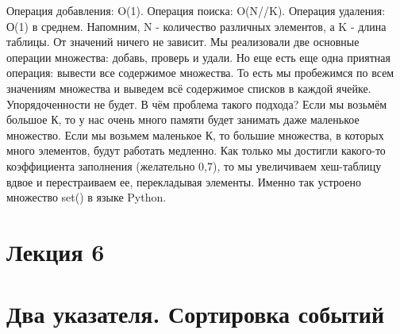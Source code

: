 \documentclass[12pt]{article}
\begin{document}
Операция добавления: O(1). Операция поиска: O(N//K). Операция удаления: О(1) в среднем. Напомним, N - количество различных элементов, а K - длина таблицы. От значений ничего не зависит. Мы реализовали две основные операции множества: добавь, проверь и удали. Но еще есть еще одна приятная операция: вывести все содержимое множества. То есть мы пробежимся по всем значениям множества и выведем всё содержимое списков в каждой ячейке. Упорядоченности не будет. В чём проблема такого подхода? Если мы возьмём большое К, то у нас очень много памяти будет занимать даже маленькое множество. Если мы возьмем маленькое К, то большие множества, в которых много элементов, будут работать медленно. Как только мы достигли какого-то коэффициента заполнения (желательно 0,7), то мы увеличиваем хеш-таблицу вдвое и перестраиваем ее, перекладывая элементы. Именно так устроено множество set() в языке Python.

\newpage
\section*{Лекция 6}
\section*{Два указателя. Сортировка событий}
\end{document}
